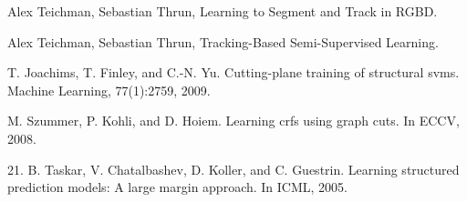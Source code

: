 \documentclass[10pt,twocolumn,letterpaper]{article}
\begin{document}

{\small


\begin{thebibliography}{20}
  Alex Teichman, Sebastian Thrun,
  Learning to Segment and Track in RGBD.

  Alex Teichman, Sebastian Thrun,
  Tracking-Based Semi-Supervised Learning.

T. Joachims, T. Finley, and C.-N. Yu. Cutting-plane training of structural svms. Machine
Learning, 77(1):2759, 2009.

M. Szummer, P. Kohli, and D. Hoiem. Learning crfs using graph cuts. In ECCV, 2008.

21. B. Taskar, V. Chatalbashev, D. Koller, and C. Guestrin. Learning structured prediction models:
A large margin approach. In ICML, 2005.

\end{thebibliography}


}
\end{document}
